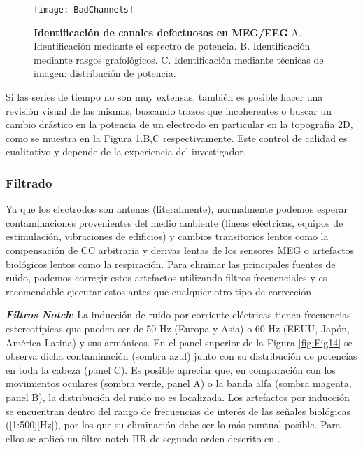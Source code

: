 \documentclass[11pt,letterpaper]{article}
\numberwithin{equation}{subsection}
\numberwithin{table}{subsection}
\begin{document}
\begin{figure}[H]
\centering
	\texttt{[image: BadChannels]}
	\captionsetup{labelfont=bf}
	\caption{\scriptsize \textbf{Identificación de canales defectuosos en MEG/EEG} A. Identificación mediante el espectro de potencia. B. Identificación mediante rasgos grafológicos. C. Identificación mediante técnicas de imagen: distribución de potencia.}
	\label{fig:Fig13}
\end{figure}

\bigskip
\noindent Si las series de tiempo no son muy extensas, también es posible hacer una revisión visual de las mismas, buscando trazos que incoherentes o buscar un cambio drástico en la potencia de un electrodo en particular en la topografía 2D, como se muestra en la Figura \ref{fig:Fig13}.B,C respectivamente. Este control de calidad es cualitativo y depende de la experiencia del investigador. 

\subsubsection{Filtrado}

\smallskip
\noindent Ya que los electrodos son antenas (literalmente), normalmente podemos esperar contaminaciones provenientes del medio ambiente (líneas eléctricas, equipos de estimulación, vibraciones de edificios) y cambios transitorios lentos como la compensación de CC arbitraria y derivas lentas de los sensores MEG o artefactos biológicos lentos como la respiración. Para eliminar las principales fuentes de ruido, podemos corregir estos artefactos utilizando filtros frecuenciales y es recomendable ejecutar estos antes que cualquier otro tipo de corrección.

\bigskip
\noindent \textit{\textbf{Filtros Notch}}: La inducción de ruido por corriente eléctricas tienen frecuencias estereotípicas que pueden ser de 50 Hz (Europa y Asia) o 60 Hz (EEUU, Japón, América Latina) y sus armónicos. En el panel superior de la Figura \ref{fig:Fig14} se observa dicha contaminación (sombra azul) junto con su distribución de potencias en toda la cabeza (panel C). Es posible apreciar que, en comparación con los movimientos oculares (sombra verde, panel A) o la banda alfa (sombra magenta, panel B),   la distribución del ruido no es localizada. Los artefactos por inducción se encuentran dentro del rango de frecuencias de interés de las señales biológicas ([1:500][Hz]), por los que su eliminación debe ser lo más puntual posible. Para ellos se aplicó un filtro notch IIR de segundo orden descrito en \cite{jeedella2006design}. 
\end{document}
